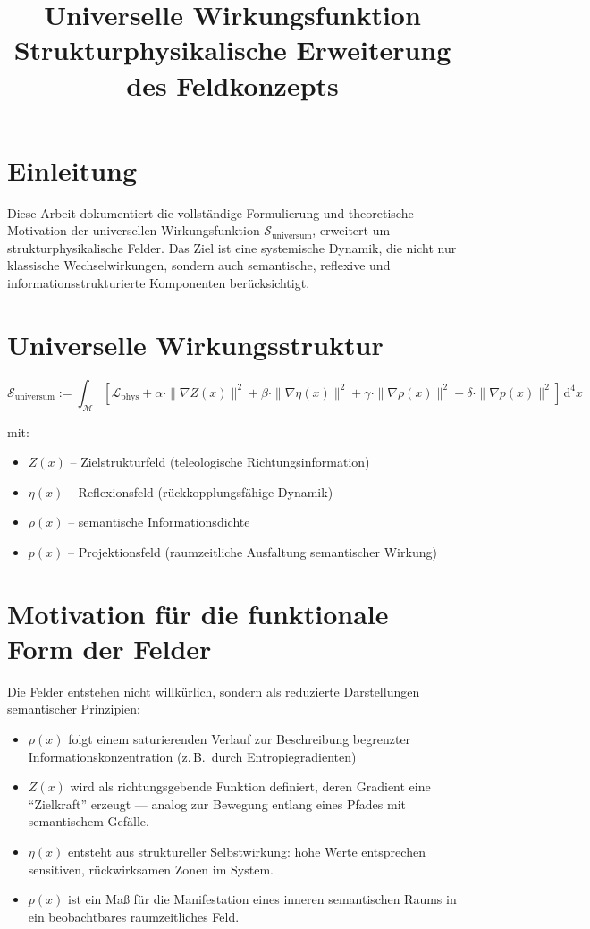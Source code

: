 \documentclass[11pt]{article}
\title{Universelle Wirkungsfunktion \\ Strukturphysikalische Erweiterung des Feldkonzepts}
\author{}
\date{}
\begin{document}
\maketitle

\section*{Einleitung}

Diese Arbeit dokumentiert die vollständige Formulierung und theoretische Motivation der universellen Wirkungsfunktion 
$\mathcal{S}_{\text{universum}}$, erweitert um strukturphysikalische Felder.  
Das Ziel ist eine systemische Dynamik, die nicht nur klassische Wechselwirkungen, sondern auch  
semantische, reflexive und informationsstrukturierte Komponenten berücksichtigt.

\section*{Universelle Wirkungsstruktur}

\[
\mathcal{S}_{\text{universum}} := \int_{\mathcal{M}} \left[
\mathcal{L}_{\text{phys}} + 
\alpha \cdot \|\nabla Z(x)\|^2 + 
\beta \cdot \|\nabla \eta(x)\|^2 + 
\gamma \cdot \|\nabla \rho(x)\|^2 +
\delta \cdot \|\nabla p(x)\|^2
\right] \, \mathrm{d}^4x
\]

mit:
\begin{itemize}
  \item $Z(x)$ – Zielstrukturfeld (teleologische Richtungsinformation)
  \item $\eta(x)$ – Reflexionsfeld (rückkopplungsfähige Dynamik)
  \item $\rho(x)$ – semantische Informationsdichte
  \item $p(x)$ – Projektionsfeld (raumzeitliche Ausfaltung semantischer Wirkung)
\end{itemize}

\section*{Motivation für die funktionale Form der Felder}

Die Felder entstehen nicht willkürlich, sondern als reduzierte Darstellungen semantischer Prinzipien:
\begin{itemize}
  \item $\rho(x)$ folgt einem saturierenden Verlauf zur Beschreibung begrenzter Informationskonzentration (z.\,B.\ durch Entropiegradienten)
  \item $Z(x)$ wird als richtungsgebende Funktion definiert, deren Gradient eine ``Zielkraft'' erzeugt --- analog zur Bewegung entlang eines Pfades mit semantischem Gefälle.
  \item $\eta(x)$ entsteht aus struktureller Selbstwirkung: hohe Werte entsprechen sensitiven, rückwirksamen Zonen im System.
  \item $p(x)$ ist ein Maß für die Manifestation eines inneren semantischen Raums in ein beobachtbares raumzeitliches Feld.
\end{itemize}
\end{document}
